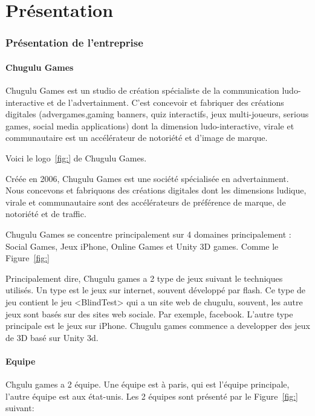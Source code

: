 \chapter{Présentation} %

\subsection{Présentation de l'entreprise} %

\subsubsection{Chugulu Games} %

Chugulu Games est un studio de création spécialiste de la communication ludo-interactive et de l'advertainment. C'est concevoir et fabriquer des créations digitales (advergames,gaming banners, quiz interactifs, jeux multi-joueurs, serious games, social media applications) dont la dimension ludo-interactive, virale et communautaire est un accélérateur de notoriété et d'image de marque.

Voici le logo~\ref{fig:} de Chugulu Games.

Créée en 2006, Chugulu Games est une société spécialisée en advertainment. Nous concevons et fabriquons des créations digitales dont les dimensions ludique, virale et communautaire sont des accélérateurs de préférence de marque, de notoriété et de traffic.

Chugulu Games se concentre principalement sur 4 domaines principalement : Social Games, Jeux iPhone, Online Games et Unity 3D games. Comme le Figure~\ref{fig:} 

Principalement dire, Chugulu games a 2 type de jeux suivant le techniques utilisés. Un type est le jeux sur internet, souvent développé par flash. Ce type de jeu contient le jeu <BlindTest> qui a un site web de chugulu, souvent, les autre jeux sont basés sur des sites web sociale. Par exemple, facebook. L'autre type principale est le jeux sur iPhone. Chugulu games commence a developper des jeux de 3D basé sur Unity 3d. 


\subsubsection{Equipe} %
\label{sub:subsection_name}

Chgulu games a 2 équipe. Une équipe est à paris, qui est l'équipe principale, l'autre équipe est aux état-unis. Les 2 équipes sont présenté par le Figure~\ref{fig:} suivant:

